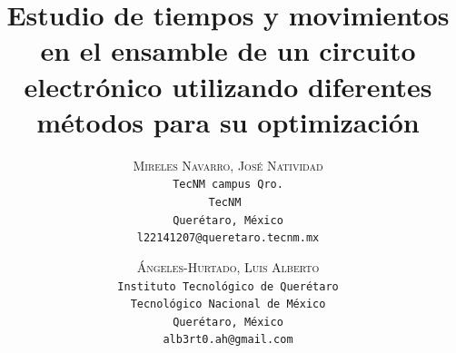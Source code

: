     \lfoot{ \thepage}
    
    \setlength{\droptitle}{-5\baselineskip} %
    \title{\textbf{Estudio de tiempos y movimientos en el ensamble de un circuito electrónico utilizando diferentes métodos para su optimización }} %
    
     \author{ 
     \textsc{Mireles Navarro, José Natividad}\\ 
     \texttt{ TecNM campus Qro. } \\ 
     \texttt{TecNM } \\ 
     \texttt{Querétaro, México}\\ 
     \texttt{l22141207@queretaro.tecnm.mx} 
     \and 
     \textsc{Ángeles-Hurtado, Luis Alberto}\\ 
     \texttt{ Instituto Tecnológico de Querétaro } \\ 
     \texttt{ Tecnológico Nacional de México } \\ 
     \texttt{Querétaro, México}\\ 
     \texttt{alb3rt0.ah@gmail.com} 
    }
    
    
    
    
    \maketitle
    \thispagestyle{fancy}
    
